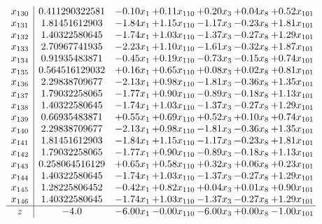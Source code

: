 \documentclass[8pt]{article}
\begin{document}
\[\begin{array}{c| c c@{\hskip 2pt} c@{\hskip 2pt} c@{\hskip 2pt} c@{\hskip 2pt} c@{\hskip 2pt} }
 x_{130}   &  0.411290322581 & -0.10 x_{1} & +  0.11 x_{110} & +  0.20 x_{3} & +  0.04 x_{8} & +  0.52 x_{101}\\
 x_{131}   &  1.81451612903 & -1.84 x_{1} & +  1.15 x_{110} & -1.17 x_{3} & -0.23 x_{8} & +  1.81 x_{101}\\
 x_{132}   &  1.40322580645 & -1.74 x_{1} & +  1.03 x_{110} & -1.37 x_{3} & -0.27 x_{8} & +  1.29 x_{101}\\
 x_{133}   &  2.70967741935 & -2.23 x_{1} & +  1.10 x_{110} & -1.61 x_{3} & -0.32 x_{8} & +  1.87 x_{101}\\
 x_{134}   &  0.91935483871 & -0.45 x_{1} & +  0.19 x_{110} & -0.73 x_{3} & -0.15 x_{8} & +  0.74 x_{101}\\
 x_{135}   &  0.564516129032 & +  0.16 x_{1} & +  0.65 x_{110} & +  0.08 x_{3} & +  0.02 x_{8} & +  0.81 x_{101}\\
 x_{136}   &  2.29838709677 & -2.13 x_{1} & +  0.98 x_{110} & -1.81 x_{3} & -0.36 x_{8} & +  1.35 x_{101}\\
 x_{137}   &  1.79032258065 & -1.77 x_{1} & +  0.90 x_{110} & -0.89 x_{3} & -0.18 x_{8} & +  1.13 x_{101}\\
 x_{138}   &  1.40322580645 & -1.74 x_{1} & +  1.03 x_{110} & -1.37 x_{3} & -0.27 x_{8} & +  1.29 x_{101}\\
 x_{139}   &  0.66935483871 & +  0.55 x_{1} & +  0.69 x_{110} & +  0.52 x_{3} & +  0.10 x_{8} & +  0.74 x_{101}\\
 x_{140}   &  2.29838709677 & -2.13 x_{1} & +  0.98 x_{110} & -1.81 x_{3} & -0.36 x_{8} & +  1.35 x_{101}\\
 x_{141}   &  1.81451612903 & -1.84 x_{1} & +  1.15 x_{110} & -1.17 x_{3} & -0.23 x_{8} & +  1.81 x_{101}\\
 x_{142}   &  1.79032258065 & -1.77 x_{1} & +  0.90 x_{110} & -0.89 x_{3} & -0.18 x_{8} & +  1.13 x_{101}\\
 x_{143}   &  0.258064516129 & +  0.65 x_{1} & +  0.58 x_{110} & +  0.32 x_{3} & +  0.06 x_{8} & +  0.23 x_{101}\\
 x_{144}   &  1.40322580645 & -1.74 x_{1} & +  1.03 x_{110} & -1.37 x_{3} & -0.27 x_{8} & +  1.29 x_{101}\\
 x_{145}   &  1.28225806452 & -0.42 x_{1} & +  0.82 x_{110} & +  0.04 x_{3} & +  0.01 x_{8} & +  0.90 x_{101}\\
 x_{146}   &  1.40322580645 & -1.74 x_{1} & +  1.03 x_{110} & -1.37 x_{3} & -0.27 x_{8} & +  1.29 x_{101}\\
\hline
z    &  -4.0 & -6.00 x_{1} & -0.00 x_{110} & -6.00 x_{3} & +  0.00 x_{8} & -1.00 x_{101}\\
\end{array}\]
\end{document}
